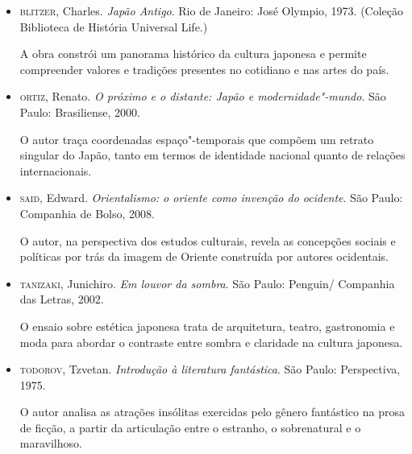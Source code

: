 \documentclass[12pt]{extarticle}
\begin{document}
\begin{itemize} \item\textsc{blitzer}, Charles. \textit{Japão Antigo}. Rio de
      Janeiro: José Olympio, 1973. (Coleção Biblioteca de História Universal
      Life.)

  A obra constrói um panorama histórico da cultura japonesa e permite
    compreender valores e tradições presentes no cotidiano e nas artes do país.

\item\textsc{ortiz}, Renato. \textit{O próximo e o distante: Japão e
  modernidade"-mundo}. São Paulo: Brasiliense, 2000.

  O autor traça coordenadas espaço"-temporais que compõem um retrato singular
    do Japão, tanto em termos de identidade nacional quanto de relações
    internacionais.

\item\textsc{said}, Edward. \textit{Orientalismo: o oriente como invenção do
  ocidente}. São Paulo: Companhia de Bolso, 2008.

  O autor, na perspectiva dos estudos culturais, revela as concepções sociais e
    políticas por trás da imagem de Oriente construída por autores ocidentais.

\item\textsc{tanizaki}, Junichiro. \textit{Em louvor da sombra}. São Paulo:
  Penguin/ Companhia das Letras, 2002.

  O ensaio sobre estética japonesa trata de arquitetura, teatro, gastronomia e
    moda para abordar o contraste entre sombra e claridade na cultura japonesa.

\item\textsc{todorov}, Tzvetan. \textit{Introdução à literatura fantástica}.
  São Paulo: Perspectiva, 1975.

  O autor analisa as atrações insólitas exercidas pelo gênero fantástico na
prosa de ficção, a partir da articulação entre o estranho, o sobrenatural e o
maravilhoso.  \end{itemize}
\end{document}
